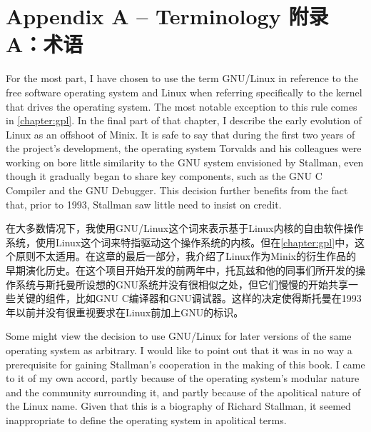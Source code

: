 

\chapter{\ifdefined\eng
Appendix A -- Terminology
\fi
\ifdefined\chs
附录A：术语
\fi
}

\ifdefined\eng
For the most part, I have chosen to use the term GNU/Linux in reference to the free software operating system and Linux when referring specifically to the kernel that drives the operating system. The most notable exception to this rule comes in \autoref{chapter:gpl}. In the final part of that chapter, I describe the early evolution of Linux as an offshoot of Minix. It is safe to say that during the first two years of the project's development, the operating system Torvalds and his colleagues were working on bore little similarity to the GNU system envisioned by Stallman, even though it gradually began to share key components, such as the GNU C Compiler and the GNU Debugger.
This decision further benefits from the fact that, prior to 1993, Stallman saw little need to insist on credit.
\fi

\ifdefined\chs
在大多数情况下，我使用GNU/Linux这个词来表示基于Linux内核的自由软件操作系统，使用Linux这个词来特指驱动这个操作系统的内核。但在\autoref{chapter:gpl}中，这个原则不太适用。在这章的最后一部分，我介绍了Linux作为Minix的衍生作品的早期演化历史。在这个项目开始开发的前两年中，托瓦兹和他的同事们所开发的操作系统与斯托曼所设想的GNU系统并没有很相似之处，但它们慢慢的开始共享一些关键的组件，比如GNU C编译器和GNU调试器。这样的决定使得斯托曼在1993年以前并没有很重视要求在Linux前加上GNU的标识。
\fi

\ifdefined\eng
Some might view the decision to use GNU/Linux for later versions of the same operating system as arbitrary. I would like to point out that it was in no way a prerequisite for gaining Stallman's cooperation in the making of this book. I came to it of my own accord, partly because of the operating system's modular nature and the community surrounding it, and partly because of the apolitical nature of the Linux name. Given that this is a biography of Richard Stallman, it seemed inappropriate to define the operating system in apolitical terms.
\fi

